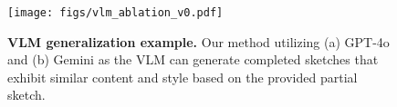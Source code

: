 \begin{figure}[!t]
  \centering
  \texttt{[image: figs/vlm\_ablation\_v0.pdf]}
  \caption{
\textbf{VLM generalization example.} 
Our method utilizing (a) GPT-4o and (b) Gemini as the VLM can generate completed sketches that exhibit similar content and style based on the provided partial sketch.
}
  \label{fig:vlm_ablation}
\end{figure}
